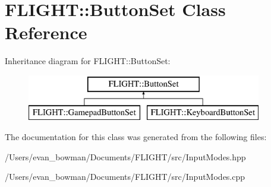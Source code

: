 \hypertarget{class_f_l_i_g_h_t_1_1_button_set}{}\section{F\+L\+I\+G\+HT\+:\+:Button\+Set Class Reference}
\label{class_f_l_i_g_h_t_1_1_button_set}
Inheritance diagram for F\+L\+I\+G\+HT\+:\+:Button\+Set\+:\begin{figure}[H]
\begin{center}
\leavevmode
\includegraphics[height=2.000000cm]{class_f_l_i_g_h_t_1_1_button_set}
\end{center}
\end{figure}


The documentation for this class was generated from the following files\+:\begin{DoxyCompactItemize}
\item 
/\+Users/evan\+\_\+bowman/\+Documents/\+F\+L\+I\+G\+H\+T/src/Input\+Modes.\+hpp\item 
/\+Users/evan\+\_\+bowman/\+Documents/\+F\+L\+I\+G\+H\+T/src/Input\+Modes.\+cpp\end{DoxyCompactItemize}
